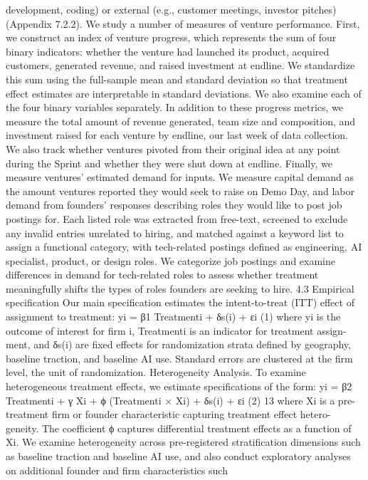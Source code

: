 development, coding) or external (e.g., customer meetings, investor pitches) (Appendix 7.2.2).
We study a number of measures of venture performance. First, we construct an index of venture
progress, which represents the sum of four binary indicators: whether the venture had launched its
product, acquired customers, generated revenue, and raised investment at endline. We standardize
this sum using the full-sample mean and standard deviation so that treatment effect estimates are
interpretable in standard deviations. We also examine each of the four binary variables separately.
In addition to these progress metrics, we measure the total amount of revenue generated, team size
and composition, and investment raised for each venture by endline, our last week of data collection.
We also track whether ventures pivoted from their original idea at any point during the Sprint and
whether they were shut down at endline.
Finally, we measure ventures’ estimated demand for inputs. We measure capital demand as the
amount ventures reported they would seek to raise on Demo Day, and labor demand from founders’
responses describing roles they would like to post job postings for. Each listed role was extracted
from free-text, screened to exclude any invalid entries unrelated to hiring, and matched against a
keyword list to assign a functional category, with tech-related postings defined as engineering, AI
specialist, product, or design roles. We categorize job postings and examine differences in demand
for tech-related roles to assess whether treatment meaningfully shifts the types of roles founders are
seeking to hire.
4.3
Empirical specification
Our main specification estimates the intent-to-treat (ITT) effect of assignment to treatment:
yi = β1 Treatmenti + δs(i) + εi
(1)
where yi is the outcome of interest for firm i, Treatmenti is an indicator for treatment assign-
ment, and δs(i) are fixed effects for randomization strata defined by geography, baseline traction,
and baseline AI use. Standard errors are clustered at the firm level, the unit of randomization.
Heterogeneity Analysis.
To examine heterogeneous treatment effects, we estimate specifications
of the form:
yi = β2 Treatmenti + γ Xi + ϕ (Treatmenti × Xi) + δs(i) + εi
(2)
13
where Xi is a pre-treatment firm or founder characteristic capturing treatment effect hetero-
geneity. The coefficient ϕ captures differential treatment effects as a function of Xi. We examine
heterogeneity across pre-registered stratification dimensions such as baseline traction and baseline
AI use, and also conduct exploratory analyses on additional founder and firm characteristics such
